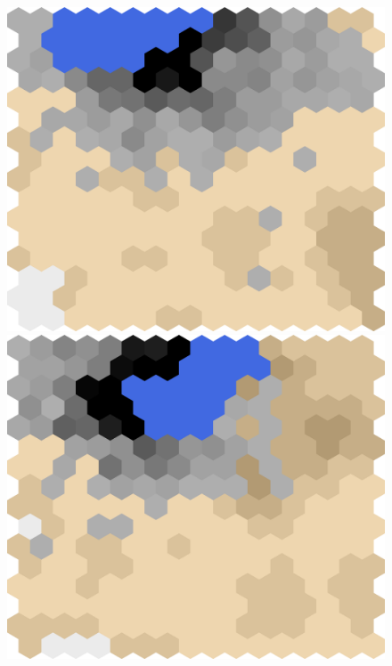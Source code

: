 \documentclass[conference]{IEEEtran}
\theoremstyle{definition}
\begin{document}
\begin{figure}
\begin{minipage}{.19\textwidth}
		\centering
		\includegraphics[width=\textwidth]{tf-c}
	\end{minipage}
	\begin{minipage}{.19\textwidth}
		\centering
		\includegraphics[width=\textwidth]{tf-d}
	\end{minipage}
	\begin{minipage}{.19\textwidth}
		\centering

\end{minipage}
\end{figure}
\end{document}
